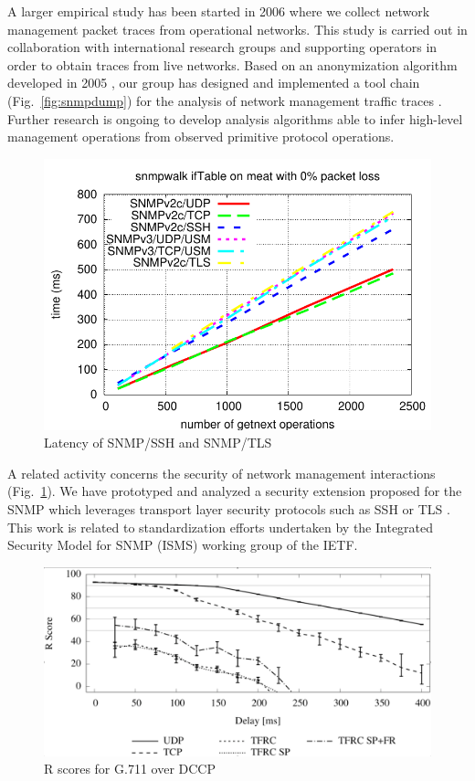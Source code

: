 A larger empirical study has been started in 2006 where we collect network management
packet traces from operational networks. This study is carried out in collaboration with
international research groups and supporting operators in order to obtain traces from live
networks. Based on an anonymization algorithm developed in 2005 \cite{HS06}, our group has
designed and implemented a tool chain (Fig.~\ref{fig:snmpdump}) for the analysis of
network management traffic traces \cite{PSHSM07}. Further research is ongoing to develop
analysis algorithms able to infer high-level management operations from observed primitive
protocol operations.

\begin{figure}[ht]
  \begin{center}
     \includegraphics[width=\hsize]{schoenwaelder-sec}
  \end{center}
  \caption{Latency of SNMP/SSH and SNMP/TLS}\label{fig:sshtls}
\end{figure}

A related activity concerns the security of network management
interactions (Fig.~\ref{fig:sshtls}). We have prototyped and analyzed
a security extension proposed for the SNMP which leverages transport
layer security protocols such as SSH or TLS \cite{MS06}. This work is
related to standardization efforts undertaken by the Integrated
Security Model for SNMP (ISMS) working group of the IETF.

\begin{figure}[ht]
  \begin{center}
     \includegraphics[width=\hsize]{schoenwaelder-dccp}
  \end{center}
  \caption{R scores for G.711 over DCCP}\label{fig:sshtls2}
\end{figure}

